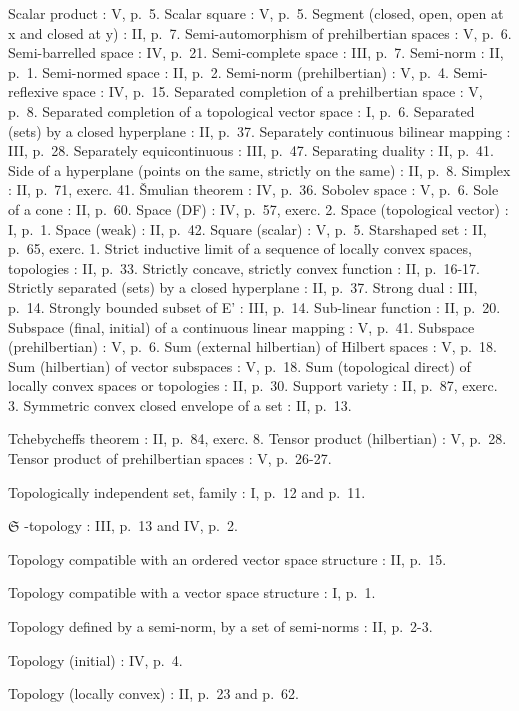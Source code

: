 Scalar product : V, p.~5. Scalar square : V, p.~5. Segment (closed, open, open at x and closed at y) : II, p.~7. Semi-automorphism of prehilbertian spaces : V, p.~6. Semi-barrelled space : IV, p.~21. Semi-complete space : III, p.~7. Semi-norm : II, p.~1. Semi-normed space : II, p.~2. Semi-norm (prehilbertian) : V, p.~4. Semi-reflexive space : IV, p.~15. Separated completion of a prehilbertian space : V, p.~8. Separated completion of a topological vector space : I, p.~6. Separated (sets) by a closed hyperplane : II, p.~37. Separately continuous bilinear mapping : III, p.~28. Separately equicontinuous : III, p.~47. Separating duality : II, p.~41. Side of a hyperplane (points on the same, strictly on the same) : II, p.~8. Simplex : II, p.~71, exerc. 41. Šmulian theorem : IV, p.~36. Sobolev space : V, p.~6. Sole of a cone : II, p.~60. Space (DF) : IV, p.~57, exerc. 2. Space (topological vector) : I, p.~1. Space (weak) : II, p.~42. Square (scalar) : V, p.~5. Starshaped set : II, p.~65, exerc. 1. Strict inductive limit of a sequence of locally convex spaces, topologies : II, p.~33. Strictly concave, strictly convex function : II, p.~16-17. Strictly separated (sets) by a closed hyperplane : II, p.~37. Strong dual : III, p.~14. Strongly bounded subset of E' : III, p.~14. Sub-linear function : II, p.~20. Subspace (final, initial) of a continuous linear mapping : V, p.~41. Subspace (prehilbertian) : V, p.~6. Sum (external hilbertian) of Hilbert spaces : V, p.~18. Sum (hilbertian) of vector subspaces : V, p.~18. Sum (topological direct) of locally convex spaces or topologies : II, p.~30. Support variety : II, p.~87, exerc. 3. Symmetric convex closed envelope of a set : II, p.~13.

Tchebycheffs theorem : II, p.~84, exerc. 8. Tensor product (hilbertian) : V, p.~28. Tensor product of prehilbertian spaces : V, p.~26-27.

Topologically independent set, family : I, p.~12 and p.~11.

\(\mathfrak{S}\) -topology : III, p.~13 and IV, p.~2.

Topology compatible with an ordered vector space structure : II, p.~15.

Topology compatible with a vector space structure : I, p.~1.

Topology defined by a semi-norm, by a set of semi-norms : II, p.~2-3.

Topology (initial) : IV, p.~4.

Topology (locally convex) : II, p.~23 and p.~62.

